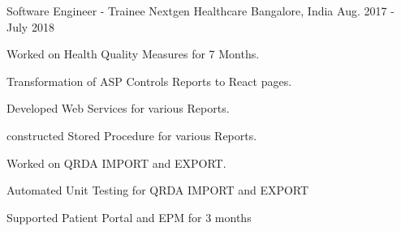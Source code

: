 \begin{cventries}
  \cventry
    { Software Engineer - Trainee} %
    {Nextgen Healthcare} %
    {Bangalore, India} %
    {Aug. 2017 - July 2018} %
    {
        \begin{cvitems} %
        \item { Worked on Health Quality Measures for 7 Months.}
        \item { Transformation of ASP Controls Reports to React pages. }
        \item { Developed Web Services for various Reports.}
        \item { constructed Stored Procedure for various Reports.}
        \item { Worked on QRDA IMPORT and EXPORT.}
        \item { Automated Unit Testing for QRDA IMPORT and EXPORT } 
        \item { Supported Patient Portal and EPM for 3 months} 
      \end{cvitems}
    }

  
\end{cventries}
